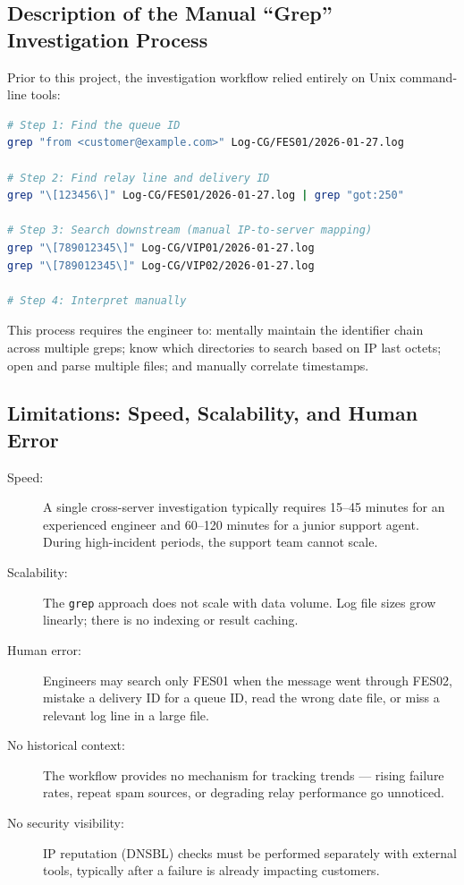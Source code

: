 \documentclass[12pt,a4paper,oneside]{report}
\begin{document}
\subsection{Description of the Manual ``Grep'' Investigation Process}

Prior to this project, the investigation workflow relied entirely on Unix command-line tools:

\begin{lstlisting}[style=reportcode,language=bash,caption={Typical manual investigation session},label={lst:grep}]
# Step 1: Find the queue ID
grep "from <customer@example.com>" Log-CG/FES01/2026-01-27.log

# Step 2: Find relay line and delivery ID
grep "\[123456\]" Log-CG/FES01/2026-01-27.log | grep "got:250"

# Step 3: Search downstream (manual IP-to-server mapping)
grep "\[789012345\]" Log-CG/VIP01/2026-01-27.log
grep "\[789012345\]" Log-CG/VIP02/2026-01-27.log

# Step 4: Interpret manually
\end{lstlisting}

This process requires the engineer to: mentally maintain the identifier chain across multiple greps; know which directories to search based on IP last octets; open and parse multiple files; and manually correlate timestamps.

\subsection{Limitations: Speed, Scalability, and Human Error}

\begin{description}
  \item[Speed:] A single cross-server investigation typically requires 15--45 minutes for an experienced engineer and 60--120 minutes for a junior support agent. During high-incident periods, the support team cannot scale.
  \item[Scalability:] The \texttt{grep} approach does not scale with data volume. Log file sizes grow linearly; there is no indexing or result caching.
  \item[Human error:] Engineers may search only FES01 when the message went through FES02, mistake a delivery ID for a queue ID, read the wrong date file, or miss a relevant log line in a large file.
  \item[No historical context:] The workflow provides no mechanism for tracking trends --- rising failure rates, repeat spam sources, or degrading relay performance go unnoticed.
  \item[No security visibility:] IP reputation (DNSBL) checks must be performed separately with external tools, typically after a failure is already impacting customers.
\end{description}
\end{document}
